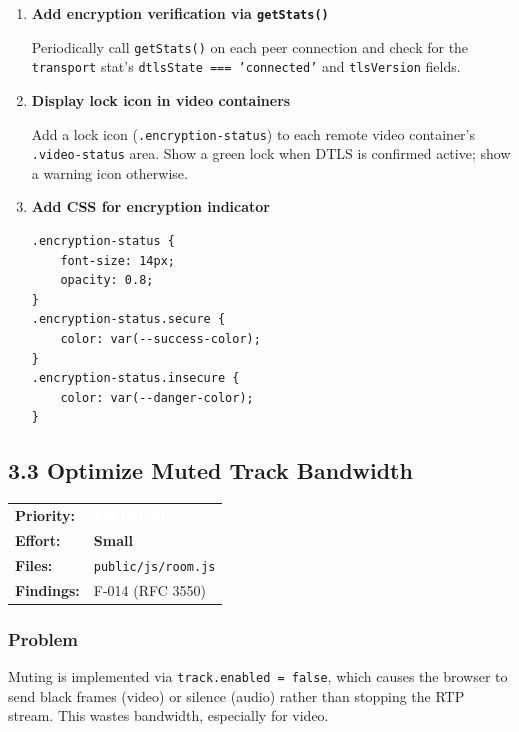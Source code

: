 \documentclass[11pt,letterpaper]{article}
\newcommand{\primedium}{\colorbox{minor!80!black}{\textcolor{white}{\small\textbf{MEDIUM}}}}
\newcommand{\effsmall}{\colorbox{compliant!30}{\small\textbf{Small}}}
\begin{document}
\begin{enumerate}[leftmargin=2em]
    \item \textbf{Add encryption verification via \texttt{getStats()}}

    Periodically call \texttt{getStats()} on each peer connection and check for the \texttt{transport} stat's \texttt{dtlsState === 'connected'} and \texttt{tlsVersion} fields.

    \item \textbf{Display lock icon in video containers}

    Add a lock icon (\texttt{.encryption-status}) to each remote video container's \texttt{.video-status} area. Show a green lock when DTLS is confirmed active; show a warning icon otherwise.

    \item \textbf{Add CSS for encryption indicator}

    \begin{verbatim}
.encryption-status {
    font-size: 14px;
    opacity: 0.8;
}
.encryption-status.secure {
    color: var(--success-color);
}
.encryption-status.insecure {
    color: var(--danger-color);
}
    \end{verbatim}
\end{enumerate}

\subsection{3.3 Optimize Muted Track Bandwidth}

\begin{tabular}{ll}
\textbf{Priority:} & \primedium \\
\textbf{Effort:} & \effsmall \\
\textbf{Files:} & \texttt{public/js/room.js} \\
\textbf{Findings:} & F-014 (RFC 3550) \\
\end{tabular}

\subsubsection{Problem}

Muting is implemented via \texttt{track.enabled = false}, which causes the browser to send black frames (video) or silence (audio) rather than stopping the RTP stream. This wastes bandwidth, especially for video.
\end{document}
